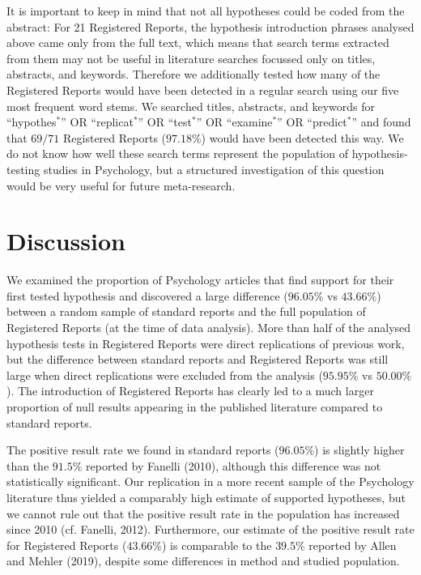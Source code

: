\documentclass[british,,jou,floatsintext]{apa6}
\begin{document}
It is important to keep in mind that not all hypotheses could be coded from the abstract: For 21 Registered Reports, the hypothesis introduction phrases analysed above came only from the full text, which means that search terms extracted from them may not be useful in literature searches focussed only on titles, abstracts, and keywords.
Therefore we additionally tested how many of the Registered Reports would have been detected in a regular search using our five most frequent word stems.
We searched titles, abstracts, and keywords for \enquote{hypothes\(^\ast\)} OR \enquote{replicat\(^\ast\)} OR \enquote{test\(^\ast\)} OR \enquote{examine\(^\ast\)} OR \enquote{predict\(^\ast\)} and found that \(69/71\) Registered Reports (\(97.18 \%\)) would have been detected this way.
We do not know how well these search terms represent the population of hypothesis-testing studies in Psychology, but a structured investigation of this question would be very useful for future meta-research.

\hypertarget{discussion}{%
\section{Discussion}\label{discussion}}

We examined the proportion of Psychology articles that find support for their first tested hypothesis and discovered a large difference (\(96.05 \%\) vs \(43.66 \%\)) between a random sample of standard reports and the full population of Registered Reports (at the time of data analysis).
More than half of the analysed hypothesis tests in Registered Reports were direct replications of previous work, but the difference between standard reports and Registered Reports was still large when direct replications were excluded from the analysis (\(95.95 \%\) vs \(50.00 \%\)).
The introduction of Registered Reports has clearly led to a much larger proportion of null results appearing in the published literature compared to standard reports.

The positive result rate we found in standard reports (\(96.05 \%\)) is slightly higher than the \(91.5\%\) reported by Fanelli (2010), although this difference was not statistically significant.
Our replication in a more recent sample of the Psychology literature thus yielded a comparably high estimate of supported hypotheses, but we cannot rule out that the positive result rate in the population has increased since 2010 (cf. Fanelli, 2012).
Furthermore, our estimate of the positive result rate for Registered Reports (\(43.66 \%\)) is comparable to the \(39.5\%\) reported by Allen and Mehler (2019), despite some differences in method and studied population.
\end{document}
